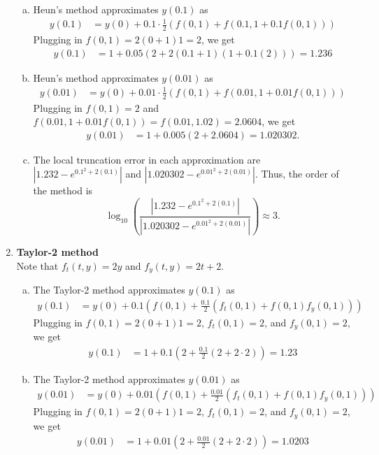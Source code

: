 \documentclass[11pt]{article}
\theoremstyle{definition}
\begin{document}
\begin{enumerate}
    \begin{enumerate}[a)]
        \item Heun's method approximates $y(0.1)$ as \begin{align*} y(0.1) &= y(0) + 0.1\cdot\frac{1}{2}(f(0, 1) + f(0.1, 1 + 0.1f(0, 1))) \end{align*}
        Plugging in $f(0, 1) = 2(0+1)1 = 2$, we get
        \begin{align*} y(0.1) &= 1 + 0.05(2 + 2(0.1 + 1)(1 + 0.1(2))) = \boxed{1.236}\end{align*}
        \item Heun's method approximates $y(0.01)$ as \begin{align*} y(0.01) &= y(0) + 0.01\cdot\frac{1}{2}(f(0, 1) + f(0.01, 1 + 0.01f(0, 1))) \end{align*}
        Plugging in $f(0, 1) = 2$ and $f(0.01, 1 + 0.01f(0,1)) = f(0.01,  1.02) = 2.0604$, we get
        \begin{align*} y(0.01) &= 1 + 0.005(2 + 2.0604) = \boxed{1.020302}.  \end{align*}
        \item The local truncation error in each approximation are $\left|1.232 - e^{0.1^2 + 2(0.1)}\right|$ and $\left|1.020302 - e^{0.01^2 + 2(0.01)} \right|.$ 
         Thus, the order of the method is \[ \log_{10} \left( \frac{\left|1.232 - e^{0.1^2 + 2(0.1)}\right|}{\left|1.020302 - e^{0.01^2 + 2(0.01)} \right|} \right) \approx \boxed{3}. \]
    \end{enumerate}

    \item \textbf{Taylor-2 method} \\
    
    Note that $f_t(t, y) = 2y$ and $f_y(t, y) = 2t + 2.$ 
    \begin{enumerate}[a)]
        \item The Taylor-2 method approximates $y(0.1)$ as 
        \begin{align*} y(0.1) &= y(0) + 0.1\left(f(0, 1) + \frac{0.1}{2}\left(f_t(0, 1) + f(0, 1)f_y(0, 1)\right)\right) \end{align*}
        Plugging in $f(0, 1) = 2(0+1)1 = 2$, $f_t(0, 1) = 2$, and $f_y(0, 1) = 2$, we get
        \begin{align*} y(0.1) &= 1 + 0.1\left(2 + \frac{0.1}{2}\left(2 + 2 \cdot 2\right)\right) = \boxed{1.23}\end{align*}
        \item The Taylor-2 method approximates $y(0.01)$ as 
        \begin{align*} y(0.01) &= y(0) + 0.01\left(f(0, 1) + \frac{0.01}{2}\left(f_t(0, 1) + f(0, 1)f_y(0, 1)\right)\right) \end{align*}
        Plugging in $f(0, 1) = 2(0+1)1 = 2$, $f_t(0, 1) = 2$, and $f_y(0, 1) = 2$, we get
        \begin{align*} y(0.01) &= 1 + 0.01\left(2 + \frac{0.01}{2}\left(2 + 2 \cdot 2\right)\right) = \boxed{1.0203}\end{align*}


\end{enumerate}
\end{enumerate}
\end{document}
